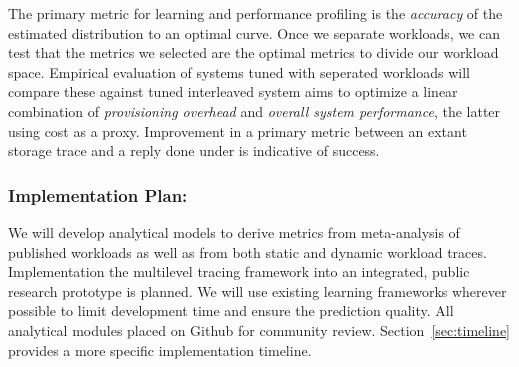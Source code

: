 The primary metric for learning and performance profiling is the
\emph{accuracy} of the estimated distribution to an optimal curve.
Once
we separate workloads, we can test that the metrics we selected are the optimal
metrics to divide our workload space.
Empirical evaluation of systems tuned with seperated workloads will compare
these against tuned interleaved system%
\at{} aims to optimize a linear combination of \emph{provisioning overhead} and \emph{overall system performance}, the latter using cost as a proxy.
Improvement in a primary metric between an extant storage trace and a reply done
under \at{} is indicative of success.
\subsubsection*{Implementation Plan: } 
We will develop analytical models to derive metrics from meta-analysis of
published workloads as well as from both static and dynamic workload traces.
Implementation the multilevel tracing framework into an integrated, public research prototype is planned.  
We will use existing learning frameworks wherever possible to limit development
time and ensure the prediction quality.  All
analytical modules placed on Github for community
review.
Section~\ref{sec:timeline} provides a more specific implementation timeline. %



